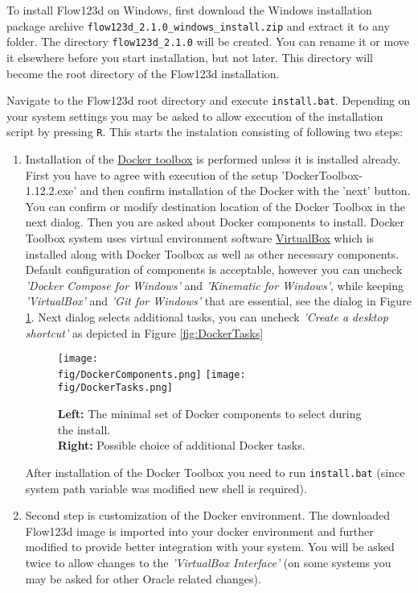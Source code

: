 \documentclass[12pt,a4paper]{report}
\def\fig{figures}
\begin{document}
To install Flow123d on Windows, first download the Windows installation package archive \verb'flow123d_2.1.0_windows_install.zip' and extract it to any folder.
The directory \verb'flow123d_2.1.0' will be created. You can rename it or move it elsewhere before you start installation, but not later. 
This directory will become the root directory of the Flow123d installation. 

Navigate to the Flow123d root directory and execute \verb'install.bat'. Depending on your system settings you may be asked to allow 
execution of the installation script by pressing \verb'R'. This starts the instalation consisting of following two steps:
\begin{enumerate}
	\item Installation of the \href{https://www.docker.com/products/docker-toolbox}{Docker toolbox} is performed unless it is installed already. 
	First you have to agree with execution of the setup 'DockerToolbox-1.12.2.exe' and then
	confirm installation of the Docker with the 'next' button. You can confirm or modify destination location of the Docker Toolbox in the next dialog.
        Then you are asked about Docker components to install. Docker Toolbox system uses virtual environment software 
        \href{https://www.virtualbox.org/}{VirtualBox} which is installed along with Docker Toolbox as well as other necessary components.
        Default configuration of components is acceptable, however you can uncheck 
        \emph{'Docker Compose for Windows'} and \emph{'Kinematic for Windows'}, while keeping \emph{'VirtualBox'} and \emph{'Git for Windows'} that are essential,
        see the dialog in Figure \ref{fig:DockerComponents}. Next dialog selects additional tasks, you can uncheck \emph{'Create a desktop shortcut'} as 
        depicted in Figure \ref{fig:DockerTasks}
        \begin{figure}
          \center  
          \texttt{[image: \\fig/DockerComponents.png]}%
          \hspace{2ex}
          \texttt{[image: \\fig/DockerTasks.png]}
          \caption{{\bf Left:} The minimal set of Docker components to select during the install.\\
                   {\bf Right:} Possible choice of additional Docker tasks.} 
          \label{fig:DockerComponents}
        \end{figure}
	After installation of the Docker Toolbox you need to run \verb'install.bat' (since system path variable was modified new shell is required). 
	\item Second step is customization of the Docker environment. The downloaded Flow123d image is imported into your docker environment 
	and further modified to provide better integration with your system.
	You will be asked twice to allow changes to the \emph{'VirtualBox Interface'} (on some systems you may be asked for other Oracle related changes).
	

\end{enumerate}
\end{document}
